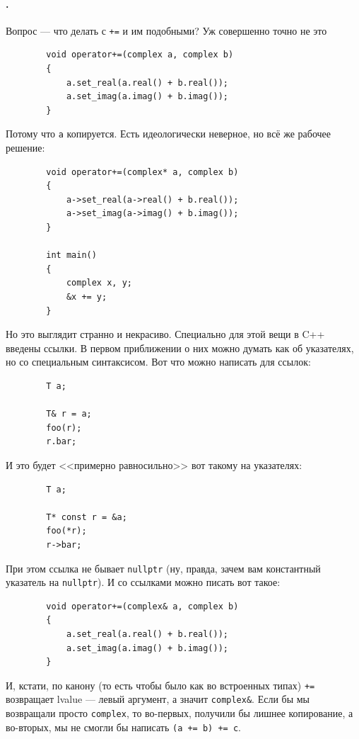 \documentclass{article}
\begin{document}
    \paragraph{.}
    Вопрос --- что делать с \texttt{+=} и им подобными? Уж совершенно точно не это
    \begin{verbatim}
        void operator+=(complex a, complex b)
        {
            a.set_real(a.real() + b.real());
            a.set_imag(a.imag() + b.imag());
        }
    \end{verbatim}
    Потому что \texttt{a} копируется. Есть идеологически неверное, но всё же рабочее решение:
    \begin{verbatim}
        void operator+=(complex* a, complex b)
        {
            a->set_real(a->real() + b.real());
            a->set_imag(a->imag() + b.imag());
        }
    
        int main()
        {
            complex x, y;
            &x += y;
        }
    \end{verbatim}
    Но это выглядит странно и некрасиво. Специально для этой вещи в C++ введены ссылки. В первом приближении о них можно думать как об указателях, но со специальным синтаксисом. Вот что можно написать для ссылок:
    \begin{verbatim}
        T a;

        T& r = a;
        foo(r);
        r.bar;
    \end{verbatim}
    И это будет <<примерно равносильно>> вот такому на указателях:
    \begin{verbatim}
        T a;

        T* const r = &a;
        foo(*r);
        r->bar;
    \end{verbatim}
    При этом ссылка не бывает \texttt{nullptr} (ну, правда, зачем вам константный указатель на \texttt{nullptr}). И со ссылками можно писать вот такое:
    \begin{verbatim}
        void operator+=(complex& a, complex b)
        {
            a.set_real(a.real() + b.real());
            a.set_imag(a.imag() + b.imag());
        }
    \end{verbatim}
    И, кстати, по канону (то есть чтобы было как во встроенных типах) \texttt{+=} возвращает lvalue --- левый аргумент, а значит \texttt{complex&}. Если бы мы возвращали просто \texttt{complex}, то во-первых, получили бы лишнее копирование, а во-вторых, мы не смогли бы написать \texttt{(a += b) += c}.
\end{document}
